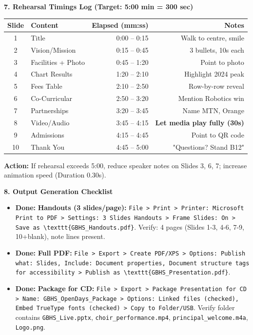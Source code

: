 \documentclass[11pt]{article}
\begin{document}
\textbf{7. Rehearsal Timings Log (Target: 5:00 min = 300 sec)}
\begin{center}
\begin{tabular}{|c|l|r|r|}\hline
\rowcolor{popblueL} \textbf{Slide} & \textbf{Content} & \textbf{Elapsed (mm:ss)} & \textbf{Notes} \\ \hline
1 & Title & 0:00 -- 0:15 & Walk to centre, smile \\ \hline
2 & Vision/Mission & 0:15 -- 0:45 & 3 bullets, 10s each \\ \hline
3 & Facilities + Photo & 0:45 -- 1:20 & Point to photo \\ \hline
4 & Chart Results & 1:20 -- 2:10 & Highlight 2024 peak \\ \hline
5 & Fees Table & 2:10 -- 2:50 & Row-by-row reveal \\ \hline
6 & Co-Curricular & 2:50 -- 3:20 & Mention Robotics win \\ \hline
7 & Partnerships & 3:20 -- 3:45 & Name MTN, Orange \\ \hline
8 & Video/Audio & 3:45 -- 4:15 & \textbf{Let media play fully (30s)} \\ \hline
9 & Admissions & 4:15 -- 4:45 & Point to QR code \\ \hline
10 & Thank You & 4:45 -- 5:00 & "Questions? Stand B12" \\ \hline
\end{tabular}
\end{center}
\textbf{Action:} If rehearsal exceeds 5:00, reduce speaker notes on Slides 3, 6, 7; increase animation speed (Duration 0.30s).

\textbf{8. Output Generation Checklist}
\begin{itemize}
    \item \textbf{Done:} \textbf{Handouts (3 slides/page):} \texttt{File > Print > Printer: Microsoft Print to PDF > Settings: 3 Slides Handouts > Frame Slides: On > Save as \textbackslash{}texttt\{GBHS\_Handouts.pdf\}}. Verify: 4 pages (Slides 1-3, 4-6, 7-9, 10+blank), note lines present.
    \item \textbf{Done:} \textbf{Full PDF:} \texttt{File > Export > Create PDF/XPS > Options: Publish what: Slides, Include: Document properties, Document structure tags for accessibility > Publish as \textbackslash{}texttt\{GBHS\_Presentation.pdf\}}.
    \item \textbf{Done:} \textbf{Package for CD:} \texttt{File > Export > Package Presentation for CD > Name: GBHS\_OpenDays\_Package > Options: Linked files (checked), Embed TrueType fonts (checked) > Copy to Folder/USB}. Verify folder contains \texttt{GBHS\_Live.pptx}, \texttt{choir\_performance.mp4}, \texttt{principal\_welcome.m4a}, \texttt{Logo.png}.
\end{itemize}
\end{document}
